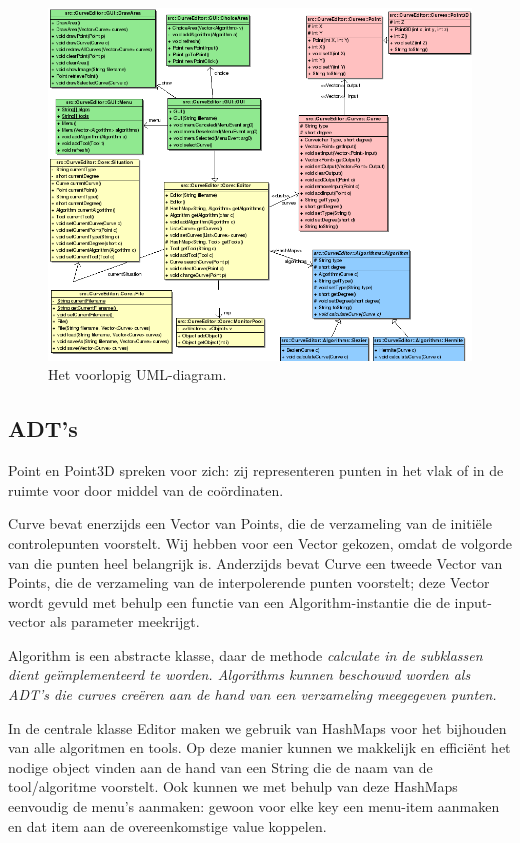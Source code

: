 \documentclass[a4paper,11pt,oneside, titlepage]{article}
\begin{document}
\begin{figure}[hbp]
\center
\includegraphics[scale=0.50]{uml.png}
\caption{Het voorlopig UML-diagram.}
\end{figure}
\clearpage

\subsection{ADT's}
Point en Point3D spreken voor zich: zij representeren punten in het vlak of in de ruimte voor door middel van de co\"ordinaten.

Curve bevat enerzijds een Vector van Points, die de verzameling van de initi\"ele controlepunten voorstelt. Wij hebben voor een Vector gekozen, omdat de volgorde van die punten heel belangrijk is. Anderzijds bevat Curve een tweede Vector van Points, die de verzameling van de interpolerende punten voorstelt; deze Vector wordt gevuld met behulp een functie van een Algorithm-instantie die de input-vector als parameter meekrijgt.

Algorithm is een abstracte klasse, daar de methode \it{calculate} \rm{in} de subklassen dient ge\"implementeerd te worden. Algorithms kunnen beschouwd worden als ADT's die curves cre\"eren aan de hand van een verzameling meegegeven punten.

In de centrale klasse Editor maken we gebruik van HashMaps voor het bijhouden van alle algoritmen en tools. Op deze manier kunnen we makkelijk en effici\"ent het nodige object vinden aan de hand van een String die de naam van de tool/algoritme voorstelt. Ook kunnen we met behulp van deze HashMaps eenvoudig de menu's aanmaken: gewoon voor elke key een menu-item aanmaken en dat item aan de overeenkomstige value koppelen.
\end{document}
